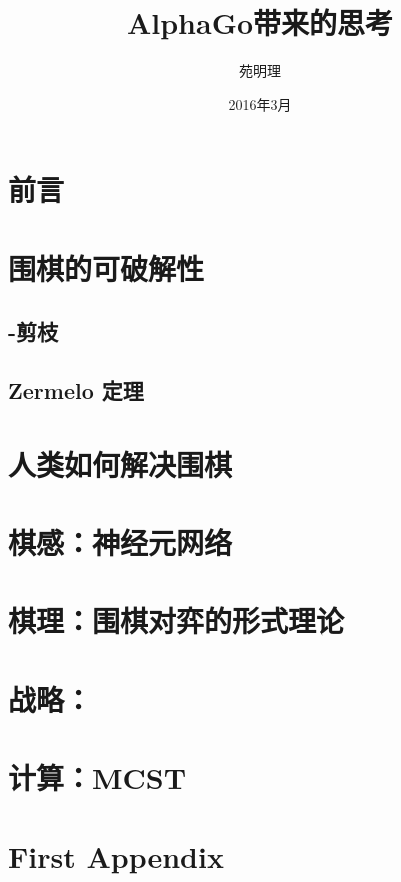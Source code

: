 \documentclass[a4paper,12pt]{article}
\title{AlphaGo带来的思考}
\author{苑明理}
\date{2016年3月}
\begin{document}
\maketitle{}

\renewcommand\contentsname{目录}
\setcounter{tocdepth}{2}
\tableofcontents

\newpage

\section{前言}

\newpage

\section{围棋的可破解性}

\subsection{\alpha-\beta 剪枝}

\subsection{Zermelo 定理}

\section{人类如何解决围棋}

\section{棋感：神经元网络}

\section{棋理：围棋对弈的形式理论}

\section{战略：}

\section{计算：MCST}

\appendix
\section{First Appendix}
\end{document}
